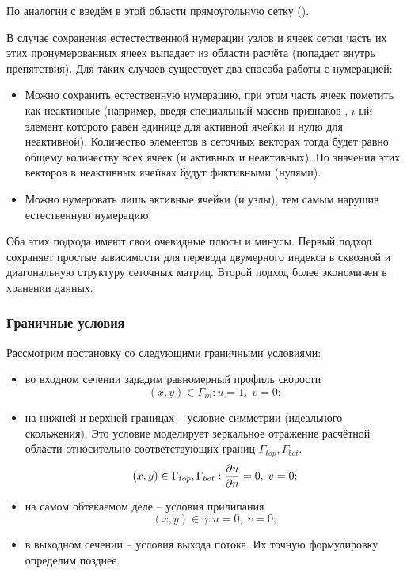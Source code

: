 По аналогии с  введём в этой области
прямоугольную сетку ().

В случае сохранения естестественной нумерации узлов и ячеек сетки
часть их этих пронумерованных ячеек выпадает из области расчёта (попадает внутрь препятствия).
Для таких случаев существует два способа работы с нумерацией:
\begin{itemize}
\item
Можно сохранить естественную нумерацию, при этом часть ячеек пометить
как неактивные (например, введя специальный массив признаков ,
$i$-ый элемент которого равен единице для активной ячейки и нулю для неактивной).
Количество элементов в сеточных векторах тогда будет равно общему количеству
всех ячеек (и активных и неактивных). Но значения этих векторов в неактивных ячейках будут фиктивными (нулями).
\item
Можно нумеровать лишь активные ячейки (и узлы), тем самым
нарушив естественную нумерацию. 
\end{itemize}

Оба этих подхода имеют свои очевидные плюсы и минусы.
Первый подход сохраняет простые зависимости для перевода двумерного индекса в сквозной и
диагональную структуру сеточных матриц. Второй подход более экономичен в хранении данных. 

\subsubsection{Граничные условия}
Рассмотрим постановку со следующими граничными условиями:
\begin{itemize}
\item
во входном сечении зададим равномерный профиль скорости
\begin{equation}
\label{eq:ns2d_obstable_bc_in}
(x, y) \in \Gamma_{in}: u=1, \; v=0;
\end{equation}
\item
на нижней и верхней границах -- условие симметрии (идеального скольжения). Это условие моделирует
зеркальное отражение расчётной области относительно соответствующих границ $\Gamma_{top}, \Gamma_{bot}$.
\begin{equation}
\label{eq:ns2d_obstable_bc_topbot}
(x, y) \in \Gamma_{top}, \Gamma_{bot}: \frac{\partial u}{\partial n}=0, \; v = 0;
\end{equation}
\item
на самом обтекаемом деле -- условия прилипания
\begin{equation}
\label{eq:ns2d_obstable_bc_wall}
(x,y) \in \gamma: u=0, \; v=0;
\end{equation}
\item
в выходном сечении -- условия выхода потока. Их точную формулировку определим позднее.
\end{itemize}

